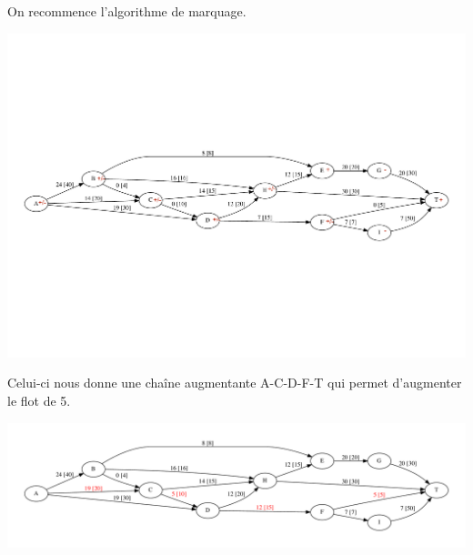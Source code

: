 \begin{frame}{}
    On recommence l'algorithme de marquage.
    \begin{center}
        \includegraphics[width=\textwidth]{tutorials/pcc/figs/reseau-5m.pdf}
    \end{center}
   
\end{frame}

\begin{frame}{}
    Celui-ci nous donne une chaîne augmentante A-C-D-F-T qui permet d'augmenter le flot de 5.
    \begin{center}
        \includegraphics[width=\textwidth]{tutorials/pcc/figs/reseau-6.pdf}
    \end{center}
   
\end{frame}


